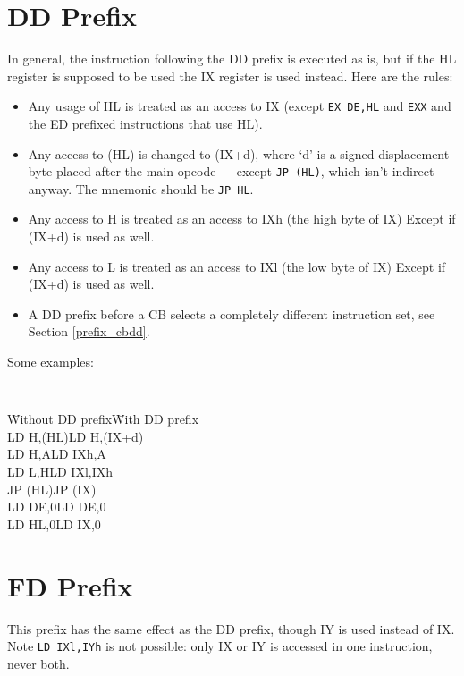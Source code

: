 \documentclass[oneside,a4paper]{book}
\begin{document}
\section{DD Prefix \cite{gerton}}

In general, the instruction following the DD prefix is executed as is, but
if the HL register is supposed to be used the IX register is used instead.
Here are the rules:

\begin{itemize}

\item Any usage of HL is treated as an access to IX (except {\tt EX DE,HL} and 
  {\tt EXX} and the ED prefixed instructions that use HL).
\item Any access to (HL) is changed to (IX+d), where `d' is a signed displacement
  byte placed after the main opcode --- except {\tt JP (HL)}, which isn't indirect
  anyway. The mnemonic should be {\tt JP HL}.
\item Any access to H is treated as an access to IXh (the high byte of IX)
  Except if (IX+d) is used as well.
\item Any access to L is treated as an access to IXl (the low byte of IX)
  Except if (IX+d) is used as well.
\item A DD prefix before a CB selects a completely different instruction 
  set, see Section {\ref{prefix_cbdd}}.\\
\end{itemize}

Some examples:

{\tt 
\begin{tabbing}
{\qquad}\={\rm Without DD prefix}\qquad\={\rm With DD prefix}\+ \\
LD H,(HL)\>LD H,(IX+d)\\
LD H,A\>LD IXh,A\\
LD L,H\>LD IXl,IXh\\
JP (HL)\>JP (IX)\\
LD DE,0\>LD DE,0\\
LD HL,0\>LD IX,0\\
\end{tabbing}
}


\section{FD Prefix \cite{gerton}}

This prefix has the same effect as the DD prefix, though IY is used instead 
of IX.  Note {\tt LD IXl,IYh} is not possible: only IX or IY is accessed in 
one instruction, never both.
\end{document}
